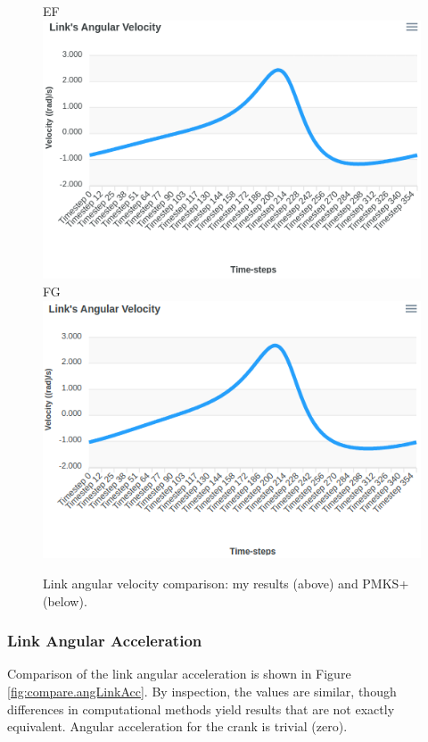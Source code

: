 \documentclass[12pt]{article}
\newcommand\hs{\hspace{1cm}}
\begin{document}
\begin{figure}[ht]
  EF \includegraphics[scale=0.35]{../pmks-plots/angLinkVel/angLinkVelEF.png}%
  \hs FG \includegraphics[scale=0.35]{../pmks-plots/angLinkVel/angLinkVelFG.png}%
  \caption{\label{fig:compare.angLinkVel}Link angular velocity comparison: my results (above) and PMKS+ (below).}
\end{figure}

\subsubsection{Link Angular Acceleration}%
\label{res.compare.angLinkAcc}

Comparison of the link angular acceleration is shown in Figure \ref{fig:compare.angLinkAcc}. By inspection, the values are similar, though differences in computational methods yield results that are not exactly equivalent. Angular acceleration for the crank is trivial (zero).
\end{document}

